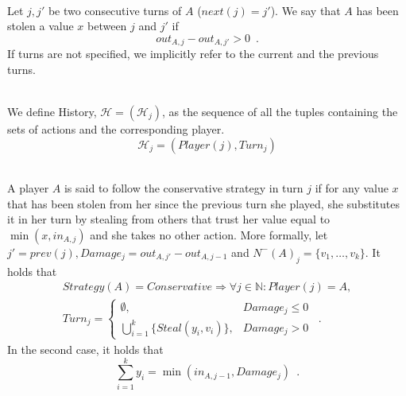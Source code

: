 \documentclass[11pt]{llncs}
\begin{document}
     \begin{definition}[$A$ is Stolen $x$] \ \\
        Let $j, j'$ be two consecutive turns of $A$ ($next\left(j\right) = j'$). We say that $A$ has been stolen a value $x$
        between $j$ and $j'$ if
        \begin{equation}
           out_{A,j} - out_{A,j'} > 0 \enspace.
        \end{equation}
        If turns are not specified, we implicitly refer to the current and the previous turns.
     \end{definition}
     \begin{definition}[History] \ \\
        We define History, $\mathcal{H} = \left(\mathcal{H}_j\right)$, as the sequence of all the tuples containing the sets
        of actions and the corresponding player.
        \begin{equation}
           \mathcal{H}_j = \left(Player\left(j\right), Turn_j\right)
        \end{equation}
     \end{definition}
     \begin{definition} \ \\
        A player $A$ is said to follow the conservative strategy in turn $j$ if for any value $x$ that has been stolen from
        her since the previous turn she played, she substitutes it in her turn by stealing from others that trust her value
        equal to $\min{(x,in_{A,j})}$ and she takes no other action.
        More formally, let $j' = prev\left(j\right), Damage_j = out_{A,j'} - out_{A,j-1}$ and $N^{-}\left(A\right)_j = \{v_1,
        \dots, v_k\}$. It holds that
        \begin{equation}
        \begin{gathered}
           Strategy\left(A\right) = Conservative \Rightarrow \forall j \in \mathbb{N}: Player\left(j\right) = A, \\
           Turn_j =
           \begin{cases}
              \emptyset, & Damage_j \leq 0 \\
              \bigcup\limits_{i=1}^{k}\{Steal\left(y_i,v_i\right)\}, & Damage_j > 0
           \end{cases} \enspace.
        \end{gathered}
        \end{equation}
        In the second case, it holds that
        \begin{equation}
           \sum\limits_{i=1}^{k}y_i = \min\left(in_{A,j-1}, Damage_j\right) \enspace.
        \end{equation}
     \end{definition}
\end{document}
